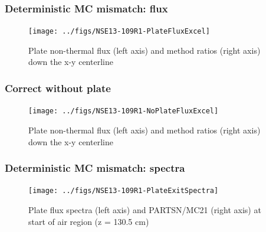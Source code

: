 \documentclass[xcolor=x11names,compress]{beamer}
\renewcommand{\(}{\begin{columns}}
\renewcommand{\)}{\end{columns}}
\newcommand{\<}[1]{\begin{column}{#1}}
\renewcommand{\>}{\end{column}}
\begin{document}
\begin{frame}[fragile]
  \frametitle{Deterministic MC mismatch: flux}
 \begin{figure}[p]
   \begin{center}
     \texttt{[image: ../figs/NSE13-109R1-PlateFluxExcel]}
   \end{center}
   \caption{Plate non-thermal flux (left axis) and method ratios (right axis) down the x-y centerline}
   \label{fig:PlateFlux}
 \end{figure}
\end{frame}


\begin{frame}[fragile]
  \frametitle{Correct without plate}
 \begin{figure}[p]
   \begin{center}
     \texttt{[image: ../figs/NSE13-109R1-NoPlateFluxExcel]}
   \end{center}
   \caption{Plate non-thermal flux (left axis) and method ratios (right axis) down the x-y centerline}
   \label{fig:noPlateFlux}
 \end{figure}
\end{frame}


\begin{frame}[fragile]
  \frametitle{Deterministic MC mismatch: spectra}
 \begin{figure}[p]
   \begin{center}
     \texttt{[image: ../figs/NSE13-109R1-PlateExitSpectra]}
   \end{center}
   \caption{Plate flux spectra (left axis) and PARTSN/MC21 (right axis) at start of air region (z = 130.5 cm)}
   \label{fig:PlateExit}
 \end{figure}
\end{frame}
\end{document}
